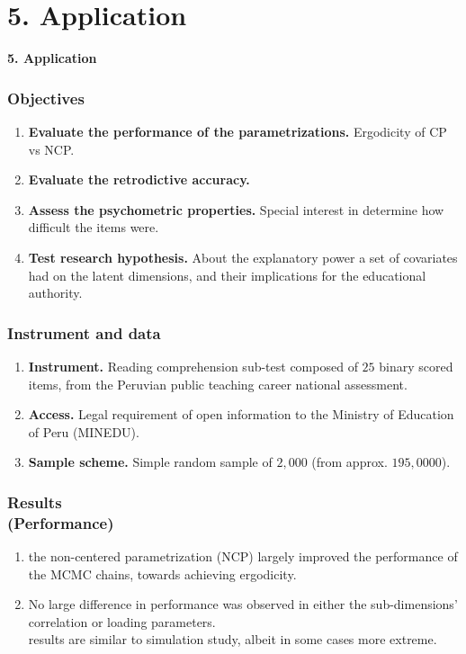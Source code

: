 \documentclass[nonav,sleutel]{beamer}
\begin{document}
	\section{5. Application}
	\begin{frame}
		\LARGE{\textbf{5. Application}}
	\end{frame}
	\begin{frame}
		\frametitle{Objectives}
		\begin{enumerate}
			\item \textbf{Evaluate the performance of the parametrizations.} Ergodicity of CP vs NCP.
			\item \textbf{Evaluate the retrodictive accuracy.}
			\item \textbf{Assess the psychometric properties.} Special interest in determine how difficult the items were.
			\item \textbf{Test research hypothesis.} About the explanatory power a set of covariates had on the latent dimensions, and their implications for the educational authority.
		\end{enumerate}
	\end{frame}
	\begin{frame}
		\frametitle{Instrument and data}
		\begin{enumerate}
			\item \textbf{Instrument.} Reading comprehension sub-test composed of $25$ binary scored items, from the Peruvian public teaching career national assessment.
			\item \textbf{Access.} Legal requirement of open information to
			the Ministry of Education of Peru (MINEDU).
			\item \textbf{Sample scheme.} Simple random sample of $2,000$ (from approx. $195,0000$).
		\end{enumerate} 
	\end{frame}
	\begin{frame}
		\frametitle{Results \\
			(Performance)}
		\begin{enumerate}
			\item the non-centered parametrization (NCP) largely
			improved the performance of the MCMC chains, towards achieving ergodicity.
			\item No large difference in performance was observed in either the sub-dimensions’ correlation or loading parameters.\\
			\vspace{0.3cm} results are similar to simulation study, albeit in some cases more extreme.
		\end{enumerate} 
	\end{frame}
\end{document}

